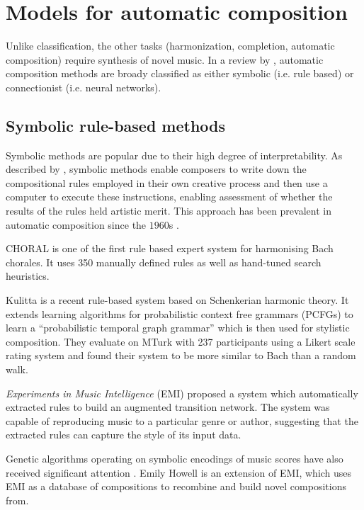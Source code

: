 \section{Models for automatic composition}

Unlike classification, the other tasks (harmonization, completion, automatic
composition) require synthesis of novel music. In a review by
\citet{toiviainen2000symbolic}, automatic composition methods are broady
classified as either symbolic (i.e. rule based) or connectionist (i.e. neural
networks).

\subsection{Symbolic rule-based methods}

Symbolic methods are popular due to their high degree of interpretability. As
described by \citet{todd1989connectionist}, symbolic methods enable composers
to write down the compositional rules employed in their own creative process
and then use a computer to execute these instructions, enabling assessment of
whether the results of the rules held artistic merit. This approach has been
prevalent in automatic composition since the $1960$s
\citep{todd1989connectionist}.

CHORAL \citep{ebciouglu1988expert} is one of the first rule based expert system
for harmonising Bach chorales. It uses 350 manually defined rules as well as
hand-tuned search heuristics.

Kulitta \citep{quick2014kulitta} is a recent rule-based system based on
Schenkerian harmonic theory\cite{schenker1954harmony}. It extends learning
algorithms for probabilistic context free grammars (PCFGs) to learn a
``probabilistic temporal graph grammar'' \citep{quick2013temporal} which is
then used for stylistic composition. They evaluate on MTurk with 237
participants using a Likert scale rating system \citep{likert1932technique}
and found their system to be more similar to Bach than a random walk.

\emph{Experiments in Music Intelligence} (EMI)
\citep{cope1987experiments,cope1992computer} proposed a system which
automatically extracted rules to build an augmented transition
network\citep{wanner1980atn}. The system was capable of reproducing music
to a particular genre or author, suggesting that the extracted rules can
capture the style of its input data. 


Genetic algorithms operating on symbolic encodings of music scores have also
received significant attention \citet{weinberg2007real,cope2010recombinant}.
Emily Howell\citep{cope2005computer} is an extension of EMI, which uses EMI as
a database of compositions to recombine and build novel compositions
from\cite{cope2010recombinant}.


